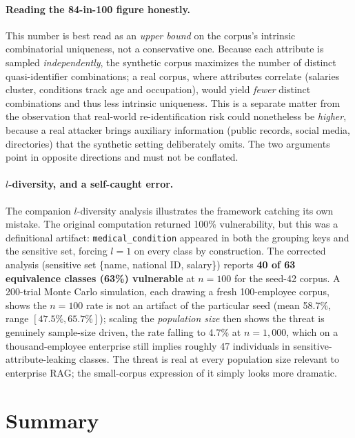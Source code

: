 \documentclass[12pt,a4paper]{report}
\begin{document}
\paragraph{Reading the 84-in-100 figure honestly.} This number is best read as an \emph{upper
bound} on the corpus's intrinsic combinatorial uniqueness, not a conservative one. Because each
attribute is sampled \emph{independently}, the synthetic corpus maximizes the number of distinct
quasi-identifier combinations; a real corpus, where attributes correlate (salaries cluster,
conditions track age and occupation), would yield \emph{fewer} distinct combinations and thus
less intrinsic uniqueness. This is a separate matter from the observation that real-world
re-identification risk could nonetheless be \emph{higher}, because a real attacker brings
auxiliary information (public records, social media, directories) that the synthetic setting
deliberately omits. The two arguments point in opposite directions and must not be conflated.

\paragraph{$l$-diversity, and a self-caught error.} The companion $l$-diversity analysis
illustrates the framework catching its own mistake. The original computation returned 100\%
vulnerability, but this was a definitional artifact: \texttt{medical\_condition} appeared in both
the grouping keys and the sensitive set, forcing $l = 1$ on every class by construction. The
corrected analysis (sensitive set \{name, national ID, salary\}) reports \textbf{40 of 63
equivalence classes (63\%) vulnerable} at $n = 100$ for the seed-42 corpus. A 200-trial Monte
Carlo simulation, each drawing a fresh 100-employee corpus, shows the $n = 100$ rate is not
an artifact of the particular seed (mean 58.7\%, range $[47.5\%, 65.7\%]$); scaling the
\emph{population size} then shows the threat is genuinely sample-size driven, the rate falling to
4.7\% at $n = 1{,}000$, which on a thousand-employee enterprise still implies roughly 47
individuals in sensitive-attribute-leaking classes. The threat is real at every population size
relevant to enterprise RAG; the small-corpus expression of it simply looks more dramatic.


\section{Summary}
\label{sec:ch3-formal-summary}
\end{document}
